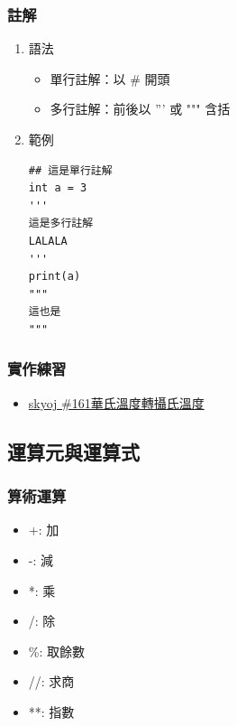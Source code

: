 \documentclass[a4paper,12pt]{article}
\begin{document}
\subsubsection{註解}
\label{sec:org0267d06}
\begin{enumerate}
\item 語法
\label{sec:orgff1de68}
\begin{itemize}
\item 單行註解：以 \# 開頭\\
\item 多行註解：前後以 ''' 或 """ 含括\\
\end{itemize}

\item 範例
\label{sec:orgad58e0d}
\lstset{breaklines=true,language=Python,label= ,caption= ,captionpos=b,firstnumber=1,numbers=left}
\begin{lstlisting}
## 這是單行註解
int a = 3
'''
這是多行註解
LALALA
'''
print(a)
"""
這也是
"""
\end{lstlisting}
\end{enumerate}

\subsubsection{實作練習}
\label{sec:org89c46e6}
\begin{itemize}
\item \href{http://skyoj.tnfsh.tn.edu.tw/sky/index.php/problem/view/161/}{skyoj \#161華氏溫度轉攝氏溫度}\\
\end{itemize}
\subsection{運算元與運算式}
\label{sec:org8ef5b3a}
\subsubsection{算術運算}
\label{sec:orgd1df183}
\begin{itemize}
\item +: 加\\
\item -: 減\\
\item *: 乘\\
\item /: 除\\
\item \%: 取餘數\\
\item //: 求商\\
\item **: 指數\\
\end{itemize}
\end{document}
